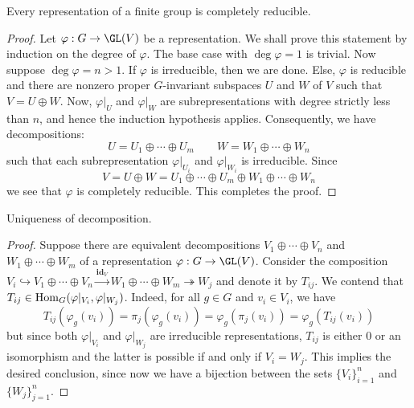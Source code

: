 \begin{theorem}[Maschke]
    Every representation of a finite group is completely reducible.
\end{theorem}
\begin{proof}
    Let $\varphi: G\to\GL(V)$ be a representation. We shall prove this statement by induction on the degree of $\varphi$. The base case with $\deg\varphi = 1$ is trivial. Now suppose $\deg\varphi = n > 1$. If $\varphi$ is irreducible, then we are done. Else, $\varphi$ is reducible and there are nonzero proper $G$-invariant subspaces $U$ and $W$ of $V$ such that $V = U\oplus W$. Now, $\varphi|_U$ and $\varphi|_W$ are subrepresentations with degree strictly less than $n$, and hence the induction hypothesis applies. Consequently, we have decompositions: 
    \begin{equation*}
        U = U_1\oplus\cdots\oplus U_m\qquad W = W_1\oplus\cdots\oplus W_n
    \end{equation*}
    such that each subrepresentation $\varphi|_{U_i}$ and $\varphi|_{W_i}$ is irreducible. Since 
    \begin{equation*}
        V = U\oplus W = U_1\oplus\cdots\oplus U_m\oplus W_1\oplus\cdots\oplus W_n
    \end{equation*}
    we see that $\varphi$ is completely reducible. This completes the proof.
\end{proof}

\begin{theorem}
    Uniqueness of decomposition.
\end{theorem}
\begin{proof}
    Suppose there are equivalent decompositions $V_1\oplus\cdots\oplus V_n$ and $W_1\oplus\cdots\oplus W_m$ of a representation $\varphi: G\to\GL(V)$. Consider the composition $V_i\hookrightarrow V_1\oplus\cdots\oplus V_n\stackrel{\mathbf{id}_V}{\longrightarrow}W_1\oplus\cdots\oplus W_m\twoheadrightarrow W_j$ and denote it by $T_{ij}$. We contend that $T_{ij}\in\operatorname{Hom}_G(\varphi|_{V_i},\varphi|_{W_j})$. Indeed, for all $g\in G$ and $v_i\in V_i$, we have 
    \begin{equation*}
        T_{ij}(\varphi_g(v_i)) = \pi_j(\varphi_g(v_i)) = \varphi_g(\pi_j(v_i)) = \varphi_g(T_{ij}(v_i))
    \end{equation*}
    but since both $\varphi|_{V_i}$ and $\varphi|_{W_j}$ are irreducible representations, $T_{ij}$ is either $0$ or an isomorphism and the latter is possible if and only if $V_i = W_j$. This implies the desired conclusion, since now we have a bijection between the sets $\{V_i\}_{i = 1}^n$ and $\{W_j\}_{j = 1}^n$.
\end{proof}
